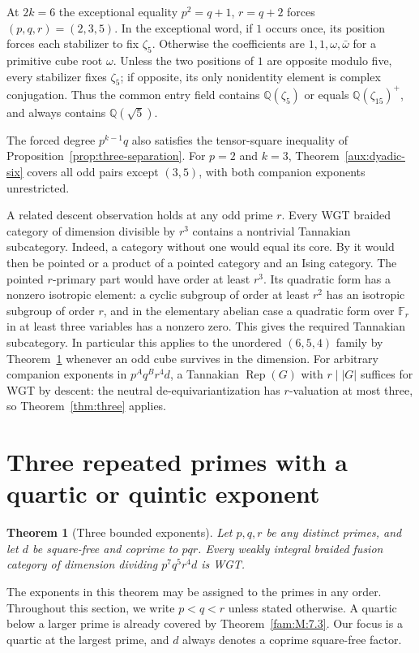 \documentclass[11pt,a4paper]{article}
\numberwithin{equation}{section}
\newtheorem{theorem}{Theorem}[section]
\theoremstyle{remark}
\newcommand{\Rep}{\operatorname{Rep}}
\newcommand{\QQ}{\mathbb Q}
\begin{document}
At $2k=6$ the exceptional equality $p^2=q+1$, $r=q+2$ forces $(p,q,r)=(2,3,5)$. In the exceptional word, if $1$ occurs once, its position forces each stabilizer to fix $\zeta_5$. Otherwise the coefficients are $1,1,\omega,\bar\omega$ for a primitive cube root $\omega$. Unless the two positions of $1$ are opposite modulo five, every stabilizer fixes $\zeta_5$; if opposite, its only nonidentity element is complex conjugation. Thus the common entry field contains $\QQ(\zeta_5)$ or equals $\QQ(\zeta_{15})^+$, and always contains $\QQ(\sqrt5)$.

The forced degree $p^{k-1}q$ also satisfies the tensor-square inequality of Proposition~\ref{prop:three-separation}. For $p=2$ and $k=3$, Theorem~\ref{aux:dyadic-six} covers all odd pairs except $(3,5)$, with both companion exponents unrestricted.

A related descent observation holds at any odd prime $r$.
Every WGT braided category of dimension divisible by $r^3$ contains a nontrivial Tannakian subcategory. Indeed, a category without one would equal its core.
By \cite[Theorem~1.1]{NataleCore} it would then be pointed or a product
of a pointed category and an Ising category. The pointed $r$-primary
part would have order at least $r^3$. Its quadratic form has a nonzero
isotropic element: a cyclic subgroup of order at least $r^2$ has an
isotropic subgroup of order $r$, and in the elementary abelian case
a quadratic form over $\mathbb F_r$ in at least three variables has a
nonzero zero. This gives the required Tannakian subcategory.
In particular this applies to the unordered $(6,5,4)$ family by
Theorem~\ref{fam:Q:1.1} whenever an odd cube survives in the dimension.
For arbitrary companion exponents in $p^Aq^Br^4d$, a Tannakian
$\Rep(G)$ with $r\mid |G|$ suffices for WGT by descent: the neutral
de-equivariantization has $r$-valuation at most three, so
Theorem~\ref{thm:three} applies.

\section{Three repeated primes with a quartic or quintic exponent}\label{fam:Q:sec:1}
\begin{theorem}[Three bounded exponents]\label{fam:Q:1.1}\label{fam:F:3.2}\label{fam:F:n:754}\label{fam:Q:n:q13:654}
Let $p,q,r$ be any distinct primes, and let $d$ be square-free
and coprime to $pqr$. Every weakly integral braided fusion category
of dimension dividing $p^7q^5r^4 d$ is WGT.
\end{theorem}
The exponents in this theorem may be assigned to the primes in
any order. Throughout this section, we write $p<q<r$
unless stated otherwise. A quartic below a larger prime is already
covered by Theorem~\ref{fam:M:7.3}. Our focus is a quartic at
the largest prime, and $d$ always denotes a coprime square-free factor.
\end{document}
